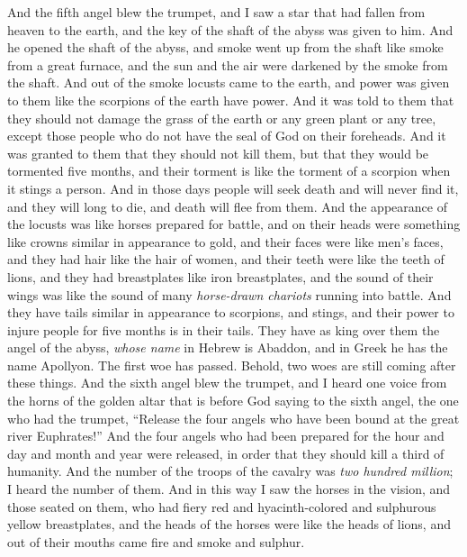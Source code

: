 \begin{biblechapter} %
 And the fifth angel blew the trumpet, and I saw a star that had fallen from heaven to the earth, and the key of the shaft of the abyss was given to him.
\verse And he opened the shaft of the abyss, and smoke went up from the shaft like smoke from a great furnace, and the sun and the air were darkened by the smoke from the shaft.
\verse And out of the smoke locusts came to the earth, and power was given to them like the scorpions of the earth have power.
\verse And it was told to them that they should not damage the grass of the earth or any green plant or any tree, except those people who do not have the seal of God on their foreheads.
\verse And it was granted to them that they should not kill them, but that they would be tormented five months, and their torment is like the torment of a scorpion when it stings a person.
\verse And in those days people will seek death and will never find it, and they will long to die, and death will flee from them.
\verse And the appearance of the locusts was like horses prepared for battle, and on their heads were something like crowns similar in appearance to gold, and their faces were like men’s faces,
\verse and they had hair like the hair of women, and their teeth were like the teeth of lions,
\verse and they had breastplates like iron breastplates, and the sound of their wings was like the sound of many \textit{horse-drawn chariots} running into battle.
\verse And they have tails similar in appearance to scorpions, and stings, and their power to injure people for five months is in their tails.
\verse They have as king over them the angel of the abyss, \textit{whose name} in Hebrew is Abaddon, and in Greek he has the name Apollyon.
\verse The first woe has passed. Behold, two woes are still coming after these things.
 And the sixth angel blew the trumpet, and I heard one voice from the horns of the golden altar that is before God
\verse saying to the sixth angel, the one who had the trumpet, “Release the four angels who have been bound at the great river Euphrates!”
\verse And the four angels who had been prepared for the hour and day and month and year were released, in order that they should kill a third of humanity.
\verse And the number of the troops of the cavalry was \textit{two hundred million}; I heard the number of them.
\verse And in this way I saw the horses in the vision, and those seated on them, who had fiery red and hyacinth-colored and sulphurous yellow breastplates, and the heads of the horses were like the heads of lions, and out of their mouths came fire and smoke and sulphur.

\end{biblechapter}
